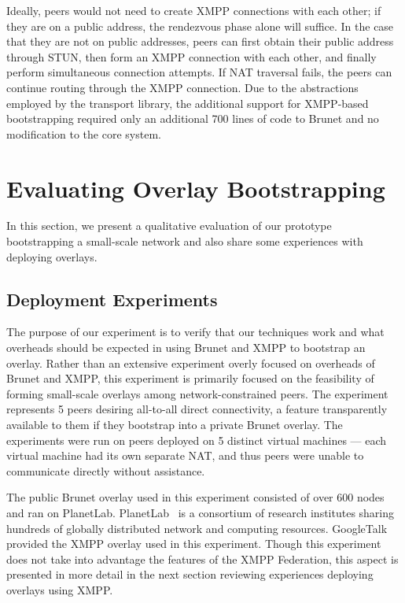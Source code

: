 \documentclass[conference]{IEEEtran}
\begin{document}
Ideally, peers would not need to create XMPP connections with each other; if
they are on a public address, the rendezvous phase alone will suffice.  In the
case that they are not on public addresses, peers can first obtain their public
address through STUN, then form an XMPP connection with each other, and finally
perform simultaneous connection attempts.  If NAT traversal fails, the peers
can continue routing through the XMPP connection.  Due to the abstractions
employed by the transport library, the additional support for XMPP-based
bootstrapping required only an additional 700 lines of code to Brunet and no
modification to the core system.

\section{Evaluating Overlay Bootstrapping}
\label{evaluations}
In this section, we present a qualitative evaluation of our prototype
bootstrapping a small-scale network and also share some experiences with
deploying overlays.

\subsection{Deployment Experiments}

The purpose of our experiment is to verify that our techniques work and what
overheads should be expected in using Brunet and XMPP to bootstrap an
overlay.  Rather than an extensive experiment overly focused on overheads of
Brunet and XMPP, this experiment is primarily focused on the feasibility of
forming small-scale overlays among network-constrained peers.  The experiment
represents 5 peers desiring all-to-all direct connectivity, a feature
transparently available to them if they bootstrap into a private Brunet
overlay. The experiments were run on peers deployed on 5 distinct virtual
machines --- each virtual machine had its own separate NAT, and thus peers were
unable to communicate directly without assistance.

The public Brunet overlay used in this experiment consisted of over 600 nodes
and ran on PlanetLab.  PlanetLab~\cite{planetlab} is a consortium of research
institutes sharing hundreds of globally distributed network and computing
resources.  GoogleTalk provided the XMPP overlay used in this experiment.
Though this experiment does not take into advantage the features of the XMPP
Federation, this aspect is presented in more detail in the next section
reviewing experiences deploying overlays using XMPP.
\end{document}
